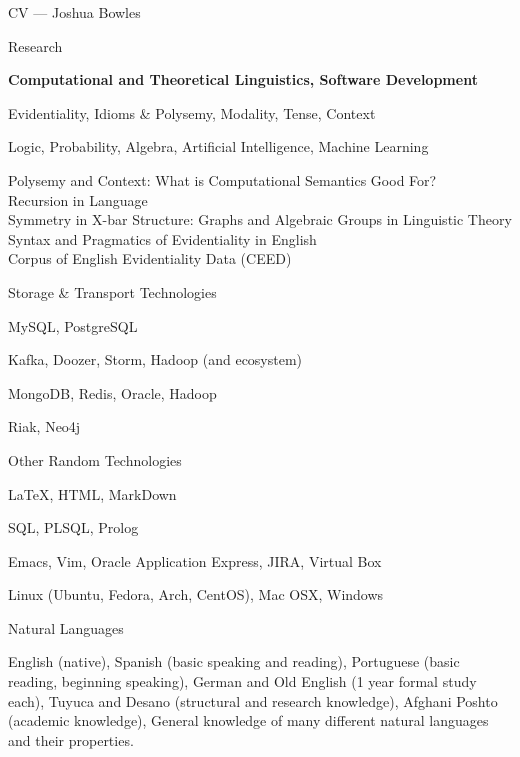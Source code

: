 \begin{cv}{CV --- Joshua Bowles}
\begin{cvlist}{Research}
\item[General] {\bf Computational and Theoretical Linguistics, Software Development}
		\small
\item[\small Linguistic] Evidentiality, Idioms \& Polysemy, Modality, Tense, Context 
\item[\small Other] Logic, Probability, Algebra, Artificial Intelligence, Machine Learning
		\normalsize
\item[Projects on Hold] \textcolor{Mygrey}{Polysemy and Context: What is Computational Semantics Good For?\\ Recursion in Language\\ Symmetry in X-bar Structure: Graphs and Algebraic Groups in Linguistic Theory\\ Syntax and Pragmatics of Evidentiality in English\\ Corpus of English Evidentiality Data (CEED)}
\end{cvlist}

\begin{cvlist}{Storage \& Transport Technologies}
\item[Most Experience] MySQL, PostgreSQL
\item[Actively Learning] Kafka, Doozer, Storm, Hadoop (and ecosystem)
\item[Limited] MongoDB, Redis, Oracle, Hadoop
\item[Interests] Riak, Neo4j
\end{cvlist}

\begin{cvlist}{Other Random Technologies}
\item[Markup] \LaTeX, HTML, MarkDown
\item[Languages] SQL, PLSQL, Prolog 
\item[Tools] Emacs, Vim, Oracle Application Express, JIRA, Virtual Box
\item[OS] Linux (Ubuntu, Fedora, Arch, CentOS), Mac OSX, Windows 
\end{cvlist}

\begin{cvlist}{Natural Languages}
\item English (native),  Spanish (basic speaking and reading), Portuguese (basic reading, beginning
speaking), German and Old English (1 year formal study each), Tuyuca and Desano (structural and research knowledge), Afghani Poshto (academic knowledge), General knowledge of many different natural languages and their properties. 
\end{cvlist}


\end{cv}
